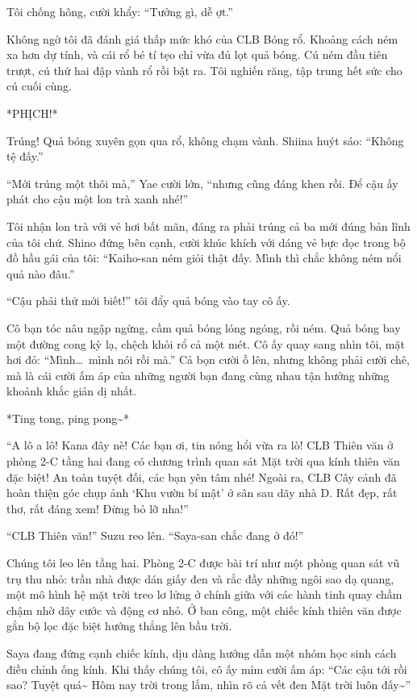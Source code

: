 \documentclass[../main.tex]{subfiles}
\begin{document}
Tôi chống hông, cười khẩy: ``Tưởng gì, dễ ợt.''

Không ngờ tôi đã đánh giá thấp mức khó của CLB Bóng rổ. Khoảng cách ném xa hơn dự tính, và cái rổ bé tí tẹo chỉ vừa đủ lọt quả bóng. Cú ném đầu tiên trượt, cú thứ hai đập vành rổ rồi bật ra. Tôi nghiến răng, tập trung hết sức cho cú cuối cùng.

*PHỊCH!*

Trúng! Quả bóng xuyên gọn qua rổ, không chạm vành. Shiina huýt sáo: ``Không tệ đấy.''

``Mới trúng một thôi mà,'' Yae cười lớn, ``nhưng cũng đáng khen rồi. Để cậu ấy phát cho cậu một lon trà xanh nhé!''

Tôi nhận lon trà với vẻ hơi bất mãn, đáng ra phải trúng cả ba mới đúng bản lĩnh của tôi chứ. Shino đứng bên cạnh, cười khúc khích với dáng vẻ bực dọc trong bộ đồ hầu gái của tôi: ``Kaiho-san ném giỏi thật đấy. Mình thì chắc không ném nổi quả nào đâu.''

``Cậu phải thử mới biết!'' tôi đẩy quả bóng vào tay cô ấy.

Cô bạn tóc nâu ngập ngừng, cầm quả bóng lóng ngóng, rồi ném. Quả bóng bay một đường cong kỳ lạ, chệch khỏi rổ cả một mét. Cô ấy quay sang nhìn tôi, mặt hơi đỏ: ``Mình\dots\ mình nói rồi mà.'' Cả bọn cười ồ lên, nhưng không phải cười chê, mà là cái cười ấm áp của những người bạn đang cùng nhau tận hưởng những khoảnh khắc giản dị nhất.

*Ting tong, ping pong\~{}*

``A lô a lô! Kana đây nè! Các bạn ơi, tin nóng hổi vừa ra lò! CLB Thiên văn ở phòng 2-C tầng hai đang có chương trình quan sát Mặt trời qua kính thiên văn đặc biệt! An toàn tuyệt đối, các bạn yên tâm nhé! Ngoài ra, CLB Cây cảnh đã hoàn thiện góc chụp ảnh `Khu vườn bí mật' ở sân sau dãy nhà D. Rất đẹp, rất thơ, rất đáng xem! Đừng bỏ lỡ nha!''

``CLB Thiên văn!'' Suzu reo lên. ``Saya-san chắc đang ở đó!''

Chúng tôi leo lên tầng hai. Phòng 2-C được bài trí như một phòng quan sát vũ trụ thu nhỏ: trần nhà được dán giấy đen và rắc đầy những ngôi sao dạ quang, một mô hình hệ mặt trời treo lơ lửng ở chính giữa với các hành tinh quay chầm chậm nhờ dây cước và động cơ nhỏ. Ở ban công, một chiếc kính thiên văn được gắn bộ lọc đặc biệt hướng thẳng lên bầu trời.

Saya đang đứng cạnh chiếc kính, dịu dàng hướng dẫn một nhóm học sinh cách điều chỉnh ống kính. Khi thấy chúng tôi, cô ấy mỉm cười ấm áp: ``Các cậu tới rồi sao? Tuyệt quá\~{} Hôm nay trời trong lắm, nhìn rõ cả vết đen Mặt trời luôn đấy\~{}''
\end{document}
